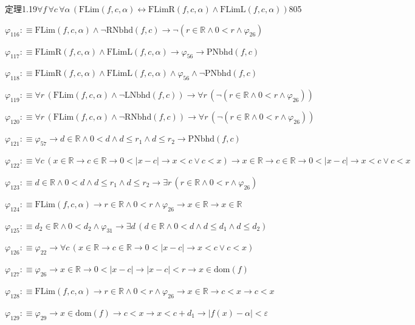 \begin{fullproof}{定理1.19}{$\forall f\,\forall c\,\forall \alpha\,(\mathrm{FLim}(f,c,\alpha) \leftrightarrow \mathrm{FLimR}(f,c,\alpha) \land \mathrm{FLimL}(f,c,\alpha))$}{805}
\begin{abbrevlist}
\item $\varphi_{116} :\equiv \mathrm{FLim}(f,c,\alpha) \land \neg \mathrm{RNbhd}(f,c) \to \neg (r \in \mathbb{R} \land 0 < r \land \varphi_{26})$
\item $\varphi_{117} :\equiv \mathrm{FLimR}(f,c,\alpha) \land \mathrm{FLimL}(f,c,\alpha) \to \varphi_{56} \to \mathrm{PNbhd}(f,c)$
\item $\varphi_{118} :\equiv \mathrm{FLimR}(f,c,\alpha) \land \mathrm{FLimL}(f,c,\alpha) \land \varphi_{56} \land \neg \mathrm{PNbhd}(f,c)$
\item $\varphi_{119} :\equiv \forall r\,(\mathrm{FLim}(f,c,\alpha) \land \neg \mathrm{LNbhd}(f,c)) \to \forall r\,(\neg (r \in \mathbb{R} \land 0 < r \land \varphi_{26}))$
\item $\varphi_{120} :\equiv \forall r\,(\mathrm{FLim}(f,c,\alpha) \land \neg \mathrm{RNbhd}(f,c)) \to \forall r\,(\neg (r \in \mathbb{R} \land 0 < r \land \varphi_{26}))$
\item $\varphi_{121} :\equiv \varphi_{57} \to d \in \mathbb{R} \land 0 < d \land d \leq r_{1} \land d \leq r_{2} \to \mathrm{PNbhd}(f,c)$
\item $\varphi_{122} :\equiv \forall c\,(x \in \mathbb{R} \to c \in \mathbb{R} \to 0 < \lvert x - c \rvert \to x < c \lor c < x) \to x \in \mathbb{R} \to c \in \mathbb{R} \to 0 < \lvert x - c \rvert \to x < c \lor c < x$
\item $\varphi_{123} :\equiv d \in \mathbb{R} \land 0 < d \land d \leq r_{1} \land d \leq r_{2} \to \exists r\,(r \in \mathbb{R} \land 0 < r \land \varphi_{26})$
\item $\varphi_{124} :\equiv \mathrm{FLim}(f,c,\alpha) \to r \in \mathbb{R} \land 0 < r \land \varphi_{26} \to x \in \mathbb{R} \to x \in \mathbb{R}$
\item $\varphi_{125} :\equiv d_{2} \in \mathbb{R} \land 0 < d_{2} \land \varphi_{31} \to \exists d\,(d \in \mathbb{R} \land 0 < d \land d \leq d_{1} \land d \leq d_{2})$
\item $\varphi_{126} :\equiv \varphi_{22} \to \forall c\,(x \in \mathbb{R} \to c \in \mathbb{R} \to 0 < \lvert x - c \rvert \to x < c \lor c < x)$
\item $\varphi_{127} :\equiv \varphi_{26} \to x \in \mathbb{R} \to 0 < \lvert x - c \rvert \to \lvert x - c \rvert < r \to x \in \mathrm{dom}(f)$
\item $\varphi_{128} :\equiv \mathrm{FLim}(f,c,\alpha) \to r \in \mathbb{R} \land 0 < r \land \varphi_{26} \to x \in \mathbb{R} \to c < x \to c < x$
\item $\varphi_{129} :\equiv \varphi_{29} \to x \in \mathrm{dom}(f) \to c < x \to x < c + d_{1} \to \lvert f(x) - \alpha \rvert < \varepsilon$

\end{abbrevlist}
\end{fullproof}
